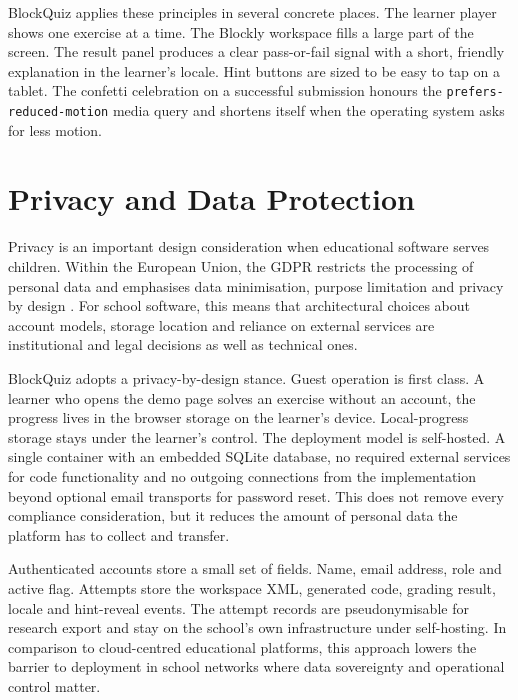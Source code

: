 BlockQuiz applies these principles in several concrete places. The
learner player shows one exercise at a time. The Blockly workspace
fills a large part of the screen. The result panel produces a clear
pass-or-fail signal with a short, friendly explanation in the
learner's locale. Hint buttons are sized to be easy to tap on a
tablet. The confetti celebration on a successful submission honours
the \texttt{prefers-reduced-motion} media query and shortens itself
when the operating system asks for less motion.

\section{Privacy and Data Protection}
Privacy is an important design consideration when educational software serves children. 
Within the European Union, the GDPR restricts the processing of personal data and 
emphasises data 
minimisation, purpose limitation and privacy by design \cite{gdpr2016}. 
For school software, this means 
that architectural choices about account models, storage location and 
reliance on external services are 
institutional and legal decisions as well as technical ones. 

BlockQuiz adopts a privacy-by-design stance. Guest operation is first class. 
A learner who opens the demo page 
solves an exercise without an account, the progress lives in the browser 
storage on the learner's device. 
Local-progress storage stays under the learner's control. The deployment 
model is self-hosted. A single container 
with an embedded SQLite database, no required external services for code 
functionality and no outgoing connections from the 
implementation beyond optional email transports for password reset. 
This does not remove every compliance consideration, but it reduces the 
amount of personal data the platform has to collect 
and transfer. 

Authenticated accounts store a small set of fields. Name, email address, role and active flag. 
Attempts store the workspace XML, generated code, grading result, locale and hint-reveal events. 
The attempt records are pseudonymisable for research export and stay on the school's own infrastructure 
under self-hosting. 
In comparison to cloud-centred educational platforms, 
this approach lowers the barrier to deployment in school networks where data sovereignty and operational
control matter. 

